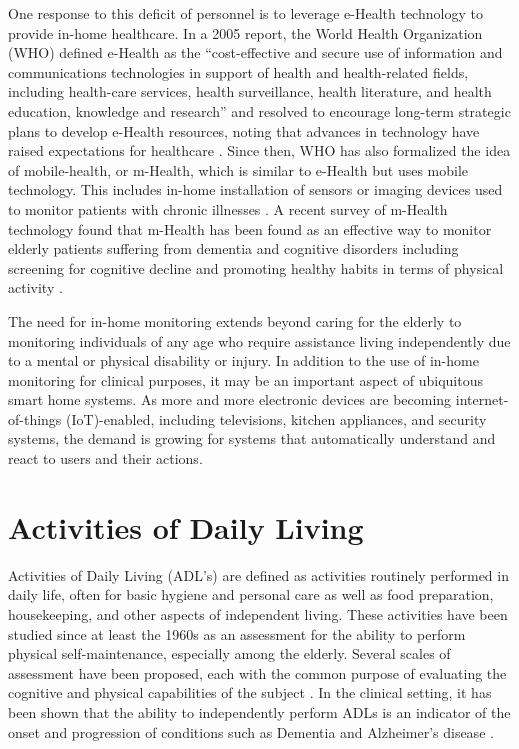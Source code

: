 \documentclass[12pt]{report}
\begin{document}
One response to this deficit of personnel is to leverage e-Health technology to provide in-home healthcare. In a 2005 report, the World Health Organization (WHO) defined e-Health as the “cost-effective and secure use of information and communications technologies in support of health and health-related fields, including health-care services, health surveillance, health literature, and health education, knowledge and research” and resolved to encourage long-term strategic plans to develop e-Health resources, noting that advances in technology have raised expectations for healthcare \cite{58thWorldHealthAssembly2005WHA58.28EHealth}. Since then, WHO has also formalized the idea of mobile-health, or m-Health, which is similar to e-Health but uses mobile technology. This includes in-home installation of sensors or imaging devices used to monitor patients with chronic illnesses \cite{WorldHealthOrganization2011MHealth:EHealth}. A recent survey of m-Health technology found that m-Health has been found as an effective way to monitor elderly patients suffering from dementia and cognitive disorders including screening for cognitive decline and promoting healthy habits in terms of physical activity \cite{Vazquez2018E-HealthReview}.

The need for in-home monitoring extends beyond caring for the elderly to monitoring individuals of any age who require assistance living independently due to a mental or physical disability or injury. In addition to the use of in-home monitoring for clinical purposes, it may be an important aspect of ubiquitous smart home systems. As more and more electronic devices are becoming internet-of-things (IoT)-enabled, including televisions, kitchen appliances, and security systems, the demand is growing for systems that automatically understand and react to users and their actions.


\section{Activities of Daily Living}
Activities of Daily Living (ADL’s) are defined as activities routinely performed in daily life, often for basic hygiene and personal care as well as food preparation, housekeeping, and other aspects of independent living. These activities have been studied since at least the 1960s \cite{LawtonAssessmentLiving} as an assessment for the ability to perform physical self-maintenance, especially among the elderly. Several scales of assessment have been proposed, each with the common purpose of evaluating the cognitive and physical capabilities of the subject \cite{LawtonAssessmentLiving, Bucks1996AssessmentScale, Carswell1993ActivitiesDisease}. In the clinical setting, it has been shown that the ability to independently perform ADLs is an indicator of the onset and progression of conditions such as Dementia and Alzheimer's disease \cite{Desai2004ActivitiesTreatment}.
\end{document}
